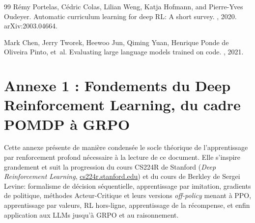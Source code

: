 \documentclass[11pt,a4paper]{article}
\begin{document}
\begin{thebibliography}{99}
R\'emy Portelas, C\'edric Colas, Lilian Weng, Katja Hofmann, and Pierre-Yves Oudeyer.
\newblock Automatic curriculum learning for deep RL: A short survey.
, 2020. arXiv:2003.04664.

Mark Chen, Jerry Tworek, Heewoo Jun, Qiming Yuan, Henrique Ponde de Oliveira Pinto, et~al.
\newblock Evaluating large language models trained on code.
, 2021.




\end{thebibliography}









\appendix



\newpage
\section{Annexe 1 : Fondements du Deep Reinforcement Learning, du cadre POMDP à GRPO}
\label{annexe:maths_rl}

Cette annexe présente de manière condensée le socle théorique de l'apprentissage par renforcement profond nécessaire à la lecture de ce document. Elle s'inspire grandement et suit la progression du cours CS224R de Stanford (\emph{Deep Reinforcement Learning}, \href{https://cs224r.stanford.edu/}{cs224r.stanford.edu}) et du cours de Berkley de Sergei Levine: formalisme de décision séquentielle, apprentissage par imitation, gradients de politique, méthodes Acteur-Critique et leurs versions \emph{off-policy} menant à PPO, apprentissage par valeurs, RL hors-ligne, apprentissage de la récompense, et enfin application aux LLMs jusqu'à GRPO et au raisonnement.

\end{document}

